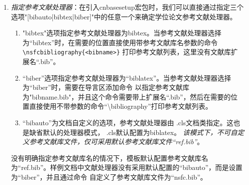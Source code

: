 \begin{enumerate}
    \item \emph{指定参考文献处理器}：在引入cnbasesetup宏包时，我们可以直接通过指定三个选项"[bibauto|bibtex|biber]"中的任意一个来确定学位论文参考文献处理器。
        \begin{enumerate}
            \item "bibtex"选项指定参考文献处理器为bibtex。当参考文献处理器选择为“bibtex”时，在需要的位置直接使用带参考文献库名参数的命令 \verb|\nsfcbibliography{<bibname>}| 打印参考文献列表，这里没有文献库扩展名“.bib”。
            \item “biber”选项指定参考文献处理器为“biblatex”。当参考文献处理器选择为“biber”时，需要在导言区添加命令 \verb|| 以指定参考文献库为"bibname.bib"，并且这个命令需要带上扩展名“.bib”，然后在需要的位置直接使用不带参数的命令“\backslash \projectname bibliography”打印参考文献列表。
            \item “bibauto”为文档自定义的选项，参考文献处理器由 \projectname.cls文档类指定。这也是缺省默认的处理器模式， \projectname.cls默认配置为biblatex。 \emph{该模式下，不可自定义参考文献库文件，仅可采用默认参考文献库文件“ref.bib”}。
        \end{enumerate}

    没有明确指定参考文献库名的情况下，模板默认配置参考文献库名为“ref.bib”。样例文档中文献处理器没有采用默认配置的“bibauto”，而是设置为“biber”，并且通过命令 \verb|| 自定义了参考文献库文件为“nsfc.bib”。
    

\end{enumerate}
